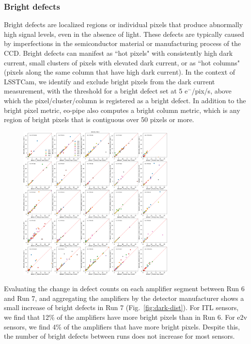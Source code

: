 \subsubsection{Bright defects}\label{bright-defects}

Bright defects are localized regions or individual pixels that produce abnormally high signal levels, even in the absence of light. These defects are typically caused by imperfections in the semiconductor material or manufacturing process of the CCD. Bright defects can manifest as ``hot pixels" with consistently high dark current, small clusters of pixels with elevated dark current, or as ``hot columns" (pixels along the same column that have high dark current). In the context of LSSTCam, we identify and exclude bright pixels from the dark current measurement, with the threshold for a bright defect set at 5 e$^-$/pix/s, above which the pixel/cluster/column is registered as a bright defect. In addition to the bright pixel metric, eo-pipe also computes a bright column metric, which is any region of bright pixels that is contiguous over 50 pixels or more.

\begin{figure}[H]
\begin{centering}
\includegraphics[width=0.7\textwidth]{sections/figures/baselineCharacterization/13557_E1071_BRIGHT_PIXELS.png}
\caption{}
\label{fig:bright}
\end{centering}
\end{figure}

Evaluating the change in defect counts on each amplifier segment between Run 6 and Run 7, and aggregating the amplifiers by the detector manufacturer shows a small increase of bright defects in Run 7 (Fig.~\ref{fig:dark-dist}). For ITL sensors, we find that 12\% of the amplifiers have more bright pixels than in Run 6. For e2v sensors, we find 4\% of the amplifiers that have more bright pixels. Despite this, the number of bright defects between runs does not increase for most sensors.


